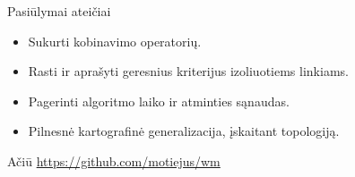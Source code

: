 \documentclass[14pt]{beamer}
\begin{document}
\begin{frame}{Pasiūlymai ateičiai}
  \begin{itemize}
    \item Sukurti kobinavimo operatorių.
    \item Rasti ir aprašyti geresnius kriterijus izoliuotiems linkiams.
    \item Pagerinti algoritmo laiko ir atminties sąnaudas.
    \item Pilnesnė kartografinė generalizacija, įskaitant topologiją.
  \end{itemize}
\end{frame}

\begin{frame}{Ačiū}
  \url{https://github.com/motiejus/wm}
\end{frame}
\end{document}
